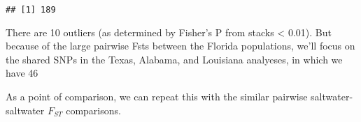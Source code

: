 \documentclass[11pt,]{article}
\newenvironment{Shaded}{\begin{snugshade}}{\end{snugshade}}
\newcommand{\StringTok}[1]{\textcolor[rgb]{0.31,0.60,0.02}{#1}}
\newcommand{\OperatorTok}[1]{\textcolor[rgb]{0.81,0.36,0.00}{\textbf{#1}}}
\newcommand{\NormalTok}[1]{#1}
\begin{document}
\begin{verbatim}
## [1] 189
\end{verbatim}

\begin{Shaded}
\end{Shaded}

There are 10 outliers (as determined by Fisher's P from stacks
\textless{} 0.01). But because of the large pairwise Fsts between the
Florida populations, we'll focus on the shared SNPs in the Texas,
Alabama, and Louisiana analyeses, in which we have 46

As a point of comparison, we can repeat this with the similar pairwise
saltwater-saltwater \(F_{ST}\) comparisons.
\end{document}
